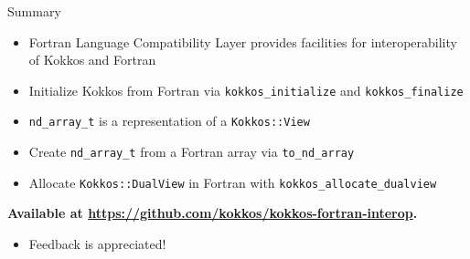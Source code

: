\begin{frame}[fragile]{Summary}
\begin{itemize}
  \item Fortran Language Compatibility Layer provides facilities for interoperability of Kokkos and Fortran
  \item Initialize Kokkos from Fortran via \texttt{kokkos\_initialize} and \texttt{kokkos\_finalize}
  \item \texttt{nd\_array\_t} is a representation of a \texttt{Kokkos::View}
  \item Create \texttt{nd\_array\_t} from a Fortran array via \texttt{to\_nd\_array}
  \item Allocate \texttt{Kokkos::DualView} in Fortran with \texttt{kokkos\_allocate\_dualview}
\end{itemize}

\vspace{10pt}
\textbf{Available at \url{https://github.com/kokkos/kokkos-fortran-interop}.}
\begin{itemize}
  \item Feedback is appreciated!
\end{itemize}
\end{frame}
